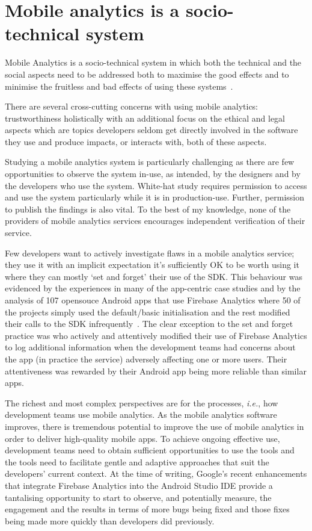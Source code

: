 \section{Mobile analytics is a socio-technical system}
Mobile Analytics is a socio-technical system in which both the technical and the social aspects need to be addressed both to maximise the good effects and to minimise the fruitless and bad effects of using these systems~.%

There are several cross-cutting concerns with using mobile analytics: trustworthiness holistically with an additional focus on the ethical and legal aspects which are topics developers seldom get directly involved in the software they use and produce impacts, or interacts with, both of these aspects.

Studying a mobile analytics system is particularly challenging as there are few opportunities to observe the system in-use, as intended, by the designers and by the developers who use the system. White-hat study requires permission to access and use the system particularly while it is in production-use. Further, permission to publish the findings is also vital. To the best of my knowledge, none of the providers of mobile analytics services encourages independent verification of their service. 

Few developers want to actively investigate flaws in a mobile analytics service; they use it with an implicit expectation it’s sufficiently OK to be worth using it where they can mostly `set and forget’ their use of the SDK. This behaviour was evidenced by the experiences in many of the app-centric case studies and by the analysis of 107 opensouce Android apps that use Firebase Analytics where 50 of the projects simply used the default/basic initialisation and the rest modified their calls to the SDK infrequently~. The clear exception to the set and forget practice was  who actively and attentively modified their use of Firebase Analytics to log additional information when the development teams had concerns about the app (in practice the service) adversely affecting one or more users. Their attentiveness was rewarded by their Android app being more reliable than similar apps.

The richest and most complex perspectives are for the processes, \emph{i.e.}, how development teams use mobile analytics. As the mobile analytics software improves, there is tremendous potential to improve the use of mobile analytics in order to deliver high-quality mobile apps. To achieve ongoing effective use, development teams need to obtain sufficient opportunities to use the tools and the tools need to facilitate gentle and adaptive approaches that suit the developers’ current context. At the time of writing, Google’s recent enhancements that integrate Firebase Analytics into the Android Studio IDE provide a tantalising opportunity to start to observe, and potentially measure, the engagement and the results in terms of more bugs being fixed and those fixes being made more quickly than developers did previously. 


